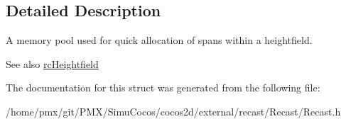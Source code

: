 \subsection{Detailed Description}
A memory pool used for quick allocation of spans within a heightfield. \begin{DoxySeeAlso}{See also}
\hyperlink{structrcHeightfield}{rc\+Heightfield} 
\end{DoxySeeAlso}


The documentation for this struct was generated from the following file\+:\begin{DoxyCompactItemize}
\item 
/home/pmx/git/\+P\+M\+X/\+Simu\+Cocos/cocos2d/external/recast/\+Recast/Recast.\+h\end{DoxyCompactItemize}
